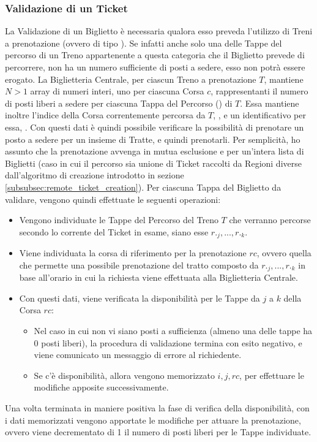 	\subsubsection {Validazione di un Ticket}\label{subsubsec:validation}
	
	La Validazione di un Biglietto è necessaria qualora esso preveda l'utilizzo di Treni a prenotazione (ovvero di tipo ). Se infatti anche solo una delle Tappe del percorso di un Treno appartenente a questa categoria che il Biglietto prevede di percorrere, non ha un numero sufficiente di posti a sedere, esso non potrà essere erogato. 
	La Biglietteria Centrale, per ciascun Treno a prenotazione $T$, mantiene $N>1$ array di numeri interi, uno per ciascuna Corsa $c$, rappresentanti il numero di posti liberi a sedere per ciascuna Tappa del Percorso () di $T$. Essa mantiene inoltre l'indice della Corsa correntemente percorsa da $T$, , e un identificativo per essa, . Con questi dati è quindi possibile verificare la possibilità di prenotare un posto a sedere per un insieme di Tratte, e quindi prenotarli. Per semplicità, ho assunto che la prenotazione avvenga in mutua esclusione e per un'intera lista di Biglietti (caso in cui il percorso sia unione di Ticket raccolti da Regioni diverse dall'algoritmo di creazione introdotto in sezione \ref{subsubsec:remote_ticket_creation}). 
	Per ciascuna Tappa del Biglietto da validare, vengono quindi effettuate le seguenti operazioni:
	\begin{itemize}
		\item Vengono individuate le Tappe del Percorso del Treno $T$ che verranno percorse secondo lo  corrente del Ticket in esame, siano esse $r._j,...,r._k$. 
		\item Viene individuata la corsa di riferimento per la prenotazione $rc$, ovvero quella che permette una possibile prenotazione del tratto composto da $r._j,...,r._k$ in base all'orario in cui la richiesta viene effettuata alla Biglietteria Centrale.  
		\item Con questi dati, viene verificata la disponibilità per le Tappe da $j$ a $k$ della Corsa $rc$:
			\begin{itemize}
				\item Nel caso in cui non vi siano posti a sufficienza (almeno una delle tappe ha 0 posti liberi), la procedura di validazione termina con esito negativo, e viene comunicato un messaggio di errore al richiedente.
				\item Se c'è disponibilità, allora vengono memorizzato $i,j,rc$, per effettuare le modifiche apposite successivamente. 
			\end{itemize}
	\end{itemize} 
	Una volta terminata in maniere positiva la fase di verifica della disponibilità, con i dati memorizzati vengono apportate le modifiche per attuare la prenotazione, ovvero viene decrementato di 1 il numero di posti liberi per le Tappe individuate.
	
